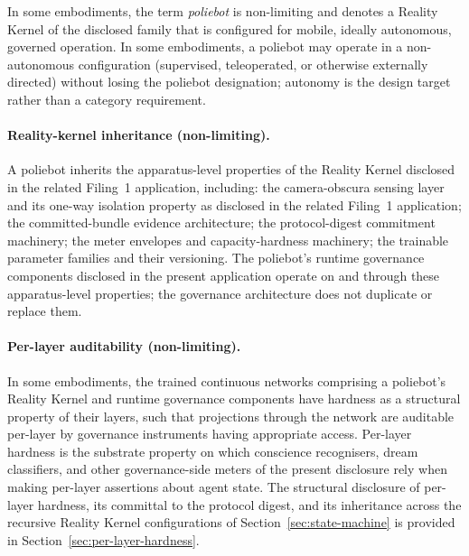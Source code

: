 \documentclass[a4paper,12pt]{article}
\newcommand{\RK}{Reality Kernel\xspace}
\begin{document}
In some embodiments, the term \emph{poliebot} is non-limiting and
denotes a \RK of the disclosed family that is configured
for mobile, ideally autonomous, governed operation. In some
embodiments, a poliebot may operate in a non-autonomous configuration
(supervised, teleoperated, or otherwise externally directed) without
losing the poliebot designation; autonomy is the design target rather
than a category requirement.

\paragraph{Reality-kernel inheritance (non-limiting).}
A poliebot inherits the apparatus-level properties of the \RK disclosed in the related Filing~1 application, including: the camera-obscura sensing
layer and its one-way isolation property as disclosed in the
related Filing~1 application; the
committed-bundle evidence architecture; the protocol-digest commitment
machinery; the meter envelopes and capacity-hardness machinery; the
trainable parameter families and their versioning. The poliebot's
runtime governance components disclosed in the present application
operate on and through these apparatus-level properties; the
governance architecture does not duplicate or replace them.

\paragraph{Per-layer auditability (non-limiting).}
In some embodiments, the trained continuous networks comprising a
poliebot's \RK and runtime governance components have
hardness as a structural property of their layers, such that
projections through the network are auditable per-layer by governance
instruments having appropriate access. Per-layer hardness is the
substrate property on which conscience recognisers, dream classifiers,
and other governance-side meters of the present disclosure rely when
making per-layer assertions about agent state. The structural
disclosure of per-layer hardness, its committal to the protocol
digest, and its inheritance across the recursive \RK
configurations of Section~\ref{sec:state-machine} is provided in
Section~\ref{sec:per-layer-hardness}.
\end{document}
